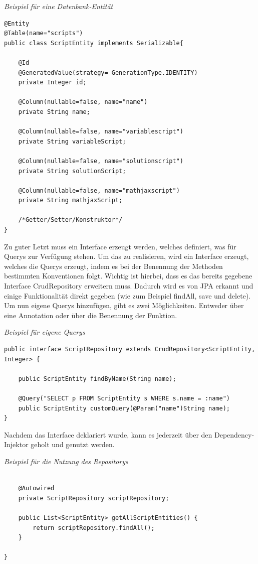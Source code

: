 \begin{minipage}{\textwidth}
\emph{Beispiel für eine Datenbank-Entität}
\begin{lstlisting}
@Entity
@Table(name="scripts")
public class ScriptEntity implements Serializable{

	@Id
	@GeneratedValue(strategy= GenerationType.IDENTITY)
	private Integer id;
	
	@Column(nullable=false, name="name")
	private String name;
	
	@Column(nullable=false, name="variablescript")
	private String variableScript;
	
	@Column(nullable=false, name="solutionscript")
	private String solutionScript;

	@Column(nullable=false, name="mathjaxscript")
	private String mathjaxScript;
	
	/*Getter/Setter/Konstruktor*/
}
\end{lstlisting}
\end{minipage}

Zu guter Letzt muss ein Interface erzeugt werden, welches definiert, was für Querys zur Verfügung stehen. Um das zu realisieren, wird ein Interface erzeugt, welches die Querys erzeugt, indem es bei der Benennung der Methoden bestimmten Konventionen folgt. Wichtig ist hierbei, dass es das bereits gegebene Interface CrudRepository erweitern muss. Dadurch wird es von JPA erkannt und einige Funktionalität direkt gegeben (wie zum Beispiel findAll, save und delete).
Um nun eigene Querys hinzufügen, gibt es zwei Möglichkeiten. Entweder über eine Annotation oder über die Benennung der Funktion. \\

\begin{minipage}{\textwidth}
\emph{Beispiel für eigene Querys}
\begin{lstlisting}
public interface ScriptRepository extends CrudRepository<ScriptEntity, Integer> {

	public ScriptEntity findByName(String name);
	
	@Query("SELECT p FROM ScriptEntity s WHERE s.name = :name")
	public ScriptEntity customQuery(@Param("name")String name);
}
\end{lstlisting}
\end{minipage}

Nachdem das Interface deklariert wurde, kann es jederzeit über den Dependency-Injektor geholt und genutzt werden.\\

\begin{minipage}{\textwidth}
\emph{Beispiel für die Nutzung des Repositorys}
\begin{lstlisting}

	@Autowired
	private ScriptRepository scriptRepository;
	
	public List<ScriptEntity> getAllScriptEntities() {
		return scriptRepository.findAll();
	}
	
}
\end{lstlisting}
\end{minipage}

